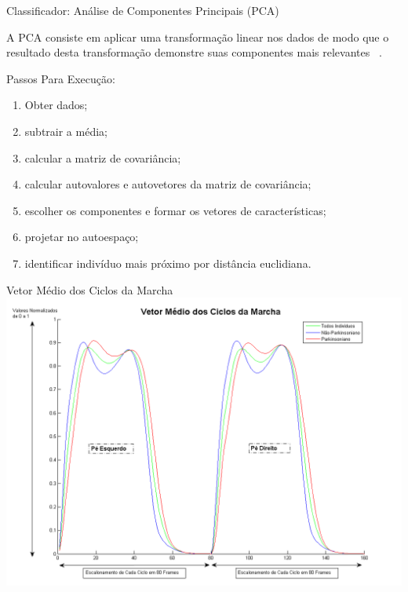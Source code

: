 \documentclass{beamer}
\begin{document}
\begin{frame}{Classificador: Análise de Componentes Principais (PCA)}
\begin{block}{}
			A PCA consiste em aplicar uma transformação linear nos dados de modo que o resultado desta transformação demonstre suas componentes mais relevantes ~\cite{smith2002}.
\end{block}

\begin{block}{Passos Para Execução:}
	\begin{enumerate}[<+->]
		\item Obter dados;
		\item subtrair a média;
		\item calcular a matriz de covariância;
		\item calcular autovalores e autovetores da matriz de covariância;
		\item escolher os componentes e formar os vetores de características;
		\item projetar no autoespaço;
		\item identificar indivíduo mais próximo por distância euclidiana.
	\end{enumerate}			
\end{block}
\end{frame}

\begin{frame}{Vetor Médio dos Ciclos da Marcha}
      \center \includegraphics[height=2.6 in]{img/vetormediociclosdamarcha.png}
\end{frame}
\end{document}
